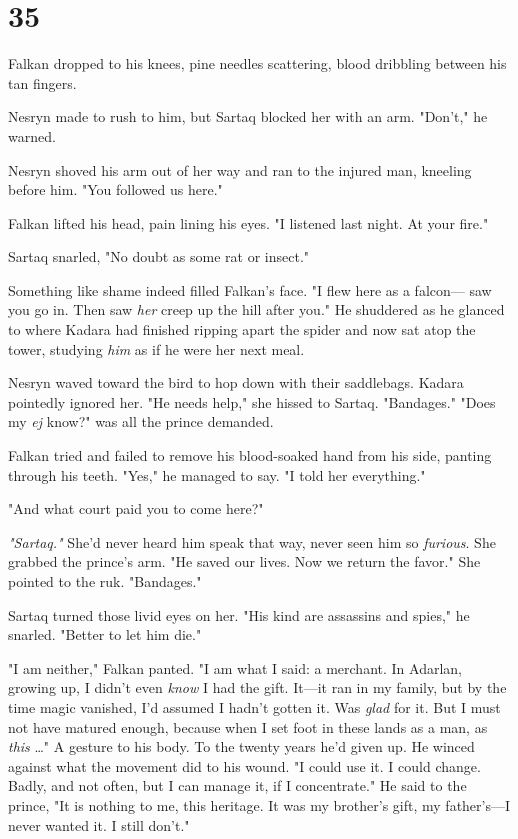 
\chapter{35}

Falkan dropped to his knees, pine needles scattering, blood dribbling between his tan fingers.

Nesryn made to rush to him, but Sartaq blocked her with an arm. "Don't," he warned.

Nesryn shoved his arm out of her way and ran to the injured man, kneeling before him. "You followed us here."

Falkan lifted his head, pain lining his eyes. "I listened last night. At your fire."

Sartaq snarled, "No doubt as some rat or insect."

Something like shame indeed filled Falkan's face. "I flew here as a falcon--- saw you go in. Then saw \emph{her} creep up the hill after you." He shuddered as he glanced to where Kadara had finished ripping apart the spider and now sat atop the tower, studying \emph{him} as if he were her next meal.

Nesryn waved toward the bird to hop down with their saddlebags. Kadara pointedly ignored her. "He needs help," she hissed to Sartaq. "Bandages." "Does my \emph{ej} know?" was all the prince demanded.

Falkan tried and failed to remove his blood-soaked hand from his side, panting through his teeth. "Yes," he managed to say. "I told her everything."

"And what court paid you to come here?"

\emph{"Sartaq."} She'd never heard him speak that way, never seen him so \emph{furious}. She grabbed the prince's arm. "He saved our lives. Now we return the favor." She pointed to the ruk. "Bandages."

Sartaq turned those livid eyes on her. "His kind are assassins and spies," he snarled. "Better to let him die."

"I am neither," Falkan panted. "I am what I said: a merchant. In Adarlan, growing up, I didn't even \emph{know} I had the gift. It---it ran in my family, but by the time magic vanished, I'd assumed I hadn't gotten it. Was \emph{glad} for it. But I must not have matured enough, because when I set foot in these lands as a man, as \emph{this} \ldots" A gesture to his body. To the twenty years he'd given up. He winced against what the movement did to his wound. "I could use it. I could change. Badly, and not often, but I can manage it, if I concentrate." He said to the prince, "It is nothing to me, this heritage. It was my brother's gift, my father's---I never wanted it. I still don't."

